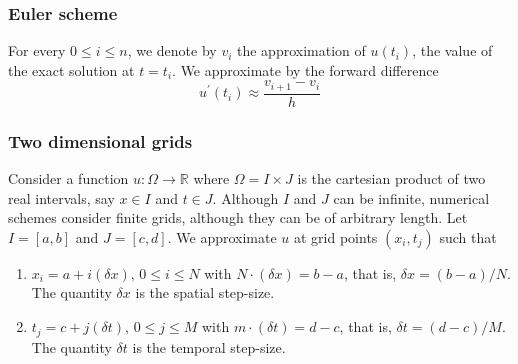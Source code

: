 \documentclass{article}
\begin{document}
\subsubsection{Euler scheme}
For every $0\leq i \leq n$, we denote by $v_i$ the approximation of $u(t_i)$, the value of the exact solution at $t=t_i$. We approximate by the forward difference
\begin{equation}
    u^\prime (t_i) \approx \frac{v_{i+1} - v_i}{h}
\end{equation}
\subsubsection{Two dimensional grids}
Consider a function $u:\Omega \to \mathbb{R} $ where $\Omega = I\times J$ is the cartesian product of two real intervals, say $x\in I$ and $t\in J$. Although $I$ and $J$ can be infinite, numerical schemes consider finite grids, although they can be of arbitrary length. Let $I=[a,b]$ and $J=[c,d]$. We approximate $u$ at grid points $(x_i,t_j)$ such that
\begin{enumerate}
    \item $x_i=a+i(\delta x),\,0\leq i\leq N$ with $N\cdot(\delta x)=b-a$, that is, $\delta x=(b-a)/N$. The quantity $\delta x$ is the spatial step-size. 
    \item $t_j=c+j(\delta t),\,0\leq j\leq M$ with $m\cdot(\delta t)=d-c$, that is, $\delta t=(d-c)/M$. The quantity $\delta t$ is the temporal step-size. 
\end{enumerate}
\end{document}
